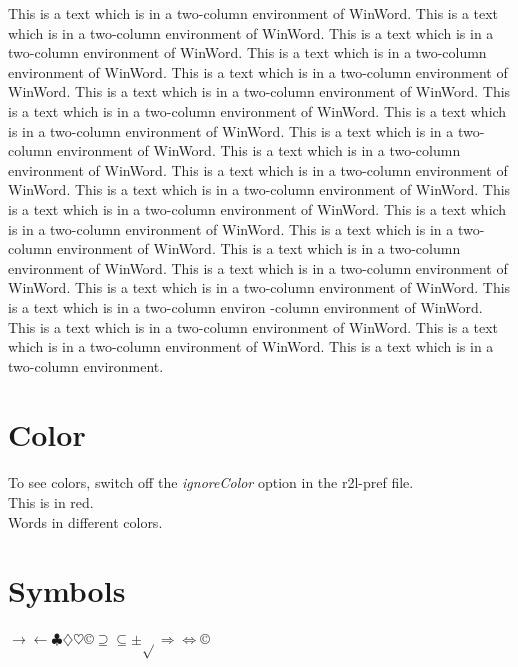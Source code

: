 \documentclass{article}
\begin{document}
\begin{multicols}{2}
This is a text which is in a two-column environment of WinWord. 
This is a text which is in a two-column environment of WinWord. 
This is a text which is in a two-column environment of WinWord. 
This is a text which is in a two-column environment of WinWord. 
This is a text which is in a two-column environment of WinWord. 
This is a text which is in a two-column environment of WinWord. 
This is a text which is in a two-column environment of WinWord. 
This is a text which is in a two-column environment of WinWord. 
This is a text which is in a two-column environment of WinWord. 
This is a text which is in a two-column environment of WinWord. 
This is a text which is in a two-column environment of WinWord. 
This is a text which is in a two-column environment of WinWord. 
This is a text which is in a two-column environment of WinWord. 
This is a text which is in a two-column environment of WinWord. 
This is a text which is in a two-column environment of WinWord. 
This is a text which is in a two-column environment of WinWord. 
This is a text which is in a two-column environment of WinWord. 
This is a text which is in a two-column environment of WinWord. 
This is a text which is in a two-column environ -column environment 
of WinWord. This is a text which is in a two-column environment 
of WinWord. This is a text which is in a two-column environment 
of WinWord. This is a text which is in a two-column environment.



\section*{
}

\end{multicols}


\section*{Color}
To see colors, switch off the \textit{ignoreColor} option in the r2l-pref 
file.\\
This is in red.\\
Words in different colors.



\section*{Symbols}
\ensuremath{\rightarrow}\ensuremath{\leftarrow}\ensuremath{\clubsuit}\ensuremath{\diamondsuit}\ensuremath{\heartsuit}{\texttrademark}{\copyright}\ensuremath{\supseteq}\ensuremath{\subseteq}\ensuremath{\pm}\ensuremath{\sqrt{}}\ensuremath{\Rightarrow}\ensuremath{\Leftrightarrow}{\copyright}
\end{document}
